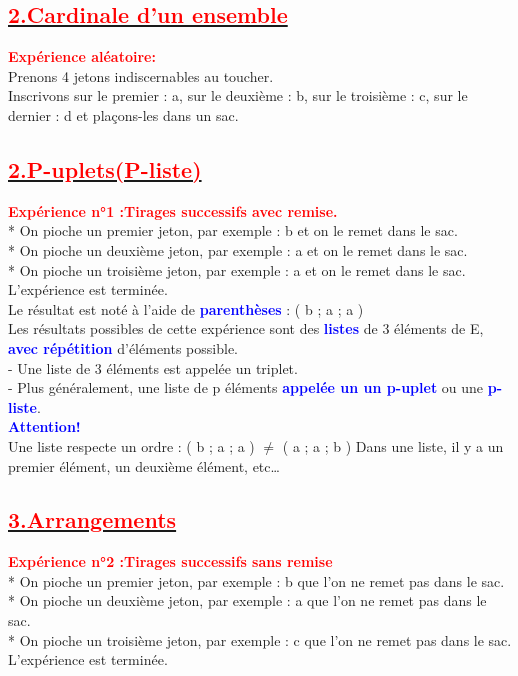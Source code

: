\documentclass[12pt]{article}
\begin{document}
\subsection*{\underline{\textbf{\textcolor{red}{2.Cardinale d'un ensemble}}}}
\textbf{\textcolor{red}{Expérience aléatoire:}}\\
Prenons 4 jetons indiscernables au toucher.\\
Inscrivons sur le premier : a, sur le deuxième : b, sur le troisième : c, sur le dernier : d et plaçons-les dans un sac.
\subsection*{\underline{\textbf{\textcolor{red}{2.P-uplets(P-liste)}}}}
\textbf{\textcolor{red}{Expérience n°1 :Tirages successifs avec remise.}}\\
* On pioche un premier jeton, par exemple : b et on le remet dans le sac.\\
* On pioche un deuxième jeton, par exemple : a et on le remet dans le sac.\\
* On pioche un troisième jeton, par exemple : a et on le remet dans le sac.\\
L’expérience est terminée. \\
Le résultat est noté à l’aide de \textbf{\textcolor{blue}{parenthèses}} : ( b ; a ; a )\\
Les résultats possibles de cette expérience sont des \textbf{\textcolor{blue}{listes}} de 3 éléments de E,  \textbf{\textcolor{blue}{avec répétition}} d’éléments possible. \\
- Une liste de 3 éléments est appelée un triplet.\\
- Plus généralement, une liste de p éléments \textbf{\textcolor{blue}{appelée un un p-uplet}} ou une \textbf{\textcolor{blue}{p-liste}}.\\
\textbf{\textcolor{blue}{Attention!}}\\
Une liste respecte un ordre : ( b ; a ; a ) $\neq$ ( a ; a ; b )
Dans une liste, il y a un premier élément, un deuxième élément, etc… 
\subsection*{\underline{\textbf{\textcolor{red}{3.Arrangements}}}}
\textbf{\textcolor{red}{Expérience n°2 :Tirages successifs sans remise}}\\
* On pioche un premier jeton, par exemple : b que l’on ne remet pas dans le sac.\\
* On pioche un deuxième jeton, par exemple : a que l’on ne remet pas dans le sac.\\
* On pioche un troisième jeton, par exemple : c que l’on ne remet pas dans le sac.\\
L’expérience est terminée.\\
\end{document}
